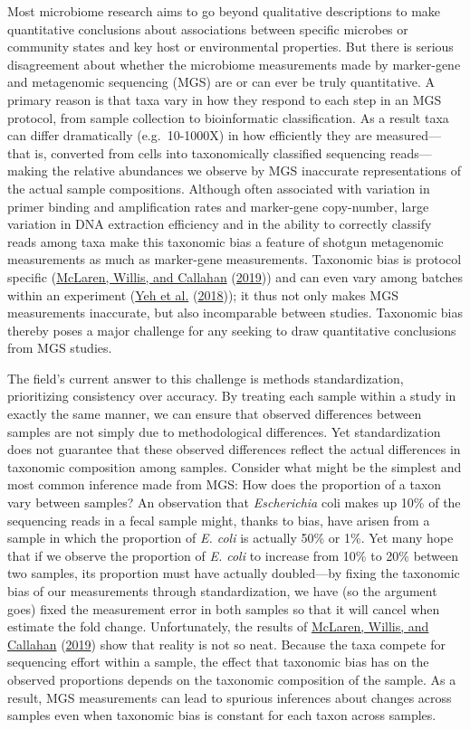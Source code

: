 \documentclass[
]{article}
\theoremstyle{definition}
\theoremstyle{definition}
\theoremstyle{definition}
\theoremstyle{definition}
\theoremstyle{remark}
\begin{document}
Most microbiome research aims to go beyond qualitative descriptions to make quantitative conclusions about associations between specific microbes or community states and key host or environmental properties.
But there is serious disagreement about whether the microbiome measurements made by marker-gene and metagenomic sequencing (MGS) are or can ever be truly quantitative. A primary reason is that taxa vary in how they respond to each step in an MGS protocol, from sample collection to bioinformatic classification.
As a result taxa can differ dramatically (e.g.~10-1000X) in how efficiently they are measured---that is, converted from cells into taxonomically classified sequencing reads---making the relative abundances we observe by MGS inaccurate representations of the actual sample compositions.
Although often associated with variation in primer binding and amplification rates and marker-gene copy-number, large variation in DNA extraction efficiency and in the ability to correctly classify reads among taxa make this taxonomic bias a feature of shotgun metagenomic measurements as much as marker-gene measurements.
Taxonomic bias is protocol specific (\protect\hyperlink{ref-mclaren2019cons}{McLaren, Willis, and Callahan} (\protect\hyperlink{ref-mclaren2019cons}{2019})) and can even vary among batches within an experiment (\protect\hyperlink{ref-yeh2018taxo}{Yeh et al.} (\protect\hyperlink{ref-yeh2018taxo}{2018})); it thus not only makes MGS measurements inaccurate, but also incomparable between studies.
Taxonomic bias thereby poses a major challenge for any seeking to draw quantitative conclusions from MGS studies.

The field's current answer to this challenge is methods standardization, prioritizing consistency over accuracy.
By treating each sample within a study in exactly the same manner, we can ensure that observed differences between samples are not simply due to methodological differences.
Yet standardization does not guarantee that these observed differences reflect the actual differences in taxonomic composition among samples.
Consider what might be the simplest and most common inference made from MGS: How does the proportion of a taxon vary between samples? An observation that \emph{Escherichia} coli makes up 10\% of the sequencing reads in a fecal sample might, thanks to bias, have arisen from a sample in which the proportion of \emph{E. coli} is actually 50\% or 1\%.
Yet many hope that if we observe the proportion of \emph{E. coli} to increase from 10\% to 20\% between two samples, its proportion must have actually doubled---by fixing the taxonomic bias of our measurements through standardization, we have (so the argument goes) fixed the measurement error in both samples so that it will cancel when estimate the fold change.
Unfortunately, the results of \protect\hyperlink{ref-mclaren2019cons}{McLaren, Willis, and Callahan} (\protect\hyperlink{ref-mclaren2019cons}{2019}) show that reality is not so neat.
Because the taxa compete for sequencing effort within a sample, the effect that taxonomic bias has on the observed proportions depends on the taxonomic composition of the sample.
As a result, MGS measurements can lead to spurious inferences about changes across samples even when taxonomic bias is constant for each taxon across samples.
\end{document}
